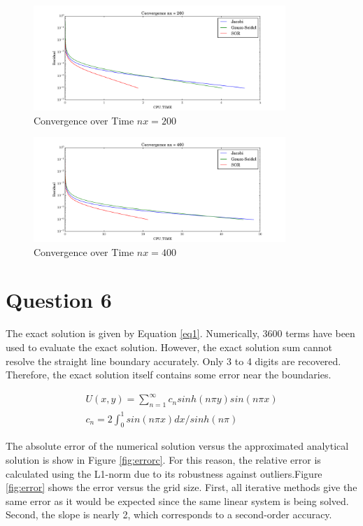 \documentclass[letterpaper,12pt,]{article}
\begin{document}
\begin{figure}[!h]
    \centering
    \includegraphics[width = 0.85\textwidth]{./Figures/time200.pdf}
    \caption{Convergence over Time $nx = 200$}
    \label{fig:time200}
\end{figure}
\begin{figure}[!h]
    \centering
    \includegraphics[width = 0.85\textwidth]{./Figures/time400.pdf}
    \caption{Convergence over Time $nx = 400$}
    \label{fig:time400}
\end{figure}

\section*{Question 6}

The exact solution is given by Equation \ref{eq1}.
Numerically, 3600 terms have been used to evaluate the exact solution.
However, the exact solution sum cannot resolve the straight line boundary accurately.
Only 3 to 4 digits are recovered.
Therefore, the exact solution itself contains some error near the boundaries.

\begin{equation}
\begin{split}
U(x,y) = \sum^{\infty}_{n=1} c_n sinh(n\pi y) sin(n \pi x)\\
c_n = 2 \int_0^1 sin(n \pi x) dx / sinh(n\pi)
\end{split}
\label{eq1}
\end{equation}

The absolute error of the numerical solution versus the approximated analytical solution is show in Figure \ref{fig:errorc}.
For this reason, the relative error is calculated using the L1-norm due to its robustness against outliers.Figure \ref{fig:error} shows the error versus the grid size.
First, all iterative methods give the same error as it would be expected since the same linear system is being solved.
Second, the slope is nearly 2, which corresponds to a second-order accuracy.
\end{document}
